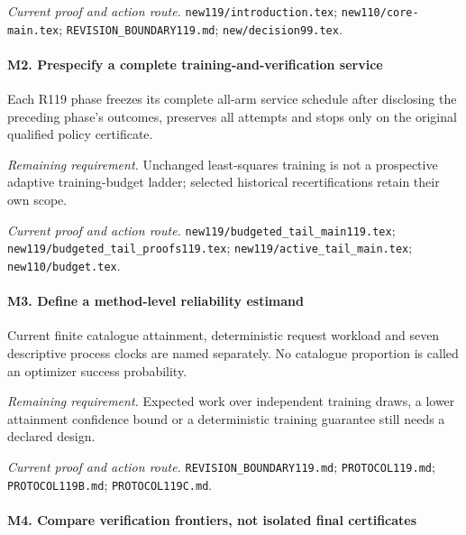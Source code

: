 \par\emph{Current proof and action route.} \nolinkurl{new119/introduction.tex}; \nolinkurl{new110/core-main.tex}; \nolinkurl{REVISION_BOUNDARY119.md}; \nolinkurl{new/decision99.tex}.

\paragraph{M2. Prespecify a complete training-and-verification service}

Each R119 phase freezes its complete all-arm service schedule after disclosing the preceding phase's outcomes, preserves all attempts and stops only on the original qualified policy certificate.

\par\emph{Remaining requirement.} Unchanged least-squares training is not a prospective adaptive training-budget ladder; selected historical recertifications retain their own scope.

\par\emph{Current proof and action route.} \nolinkurl{new119/budgeted_tail_main119.tex}; \nolinkurl{new119/budgeted_tail_proofs119.tex}; \nolinkurl{new119/active_tail_main.tex}; \nolinkurl{new110/budget.tex}.

\paragraph{M3. Define a method-level reliability estimand}

Current finite catalogue attainment, deterministic request workload and seven descriptive process clocks are named separately. No catalogue proportion is called an optimizer success probability.

\par\emph{Remaining requirement.} Expected work over independent training draws, a lower attainment confidence bound or a deterministic training guarantee still needs a declared design.

\par\emph{Current proof and action route.} \nolinkurl{REVISION_BOUNDARY119.md}; \nolinkurl{PROTOCOL119.md}; \nolinkurl{PROTOCOL119B.md}; \nolinkurl{PROTOCOL119C.md}.

\paragraph{M4. Compare verification frontiers, not isolated final certificates}


